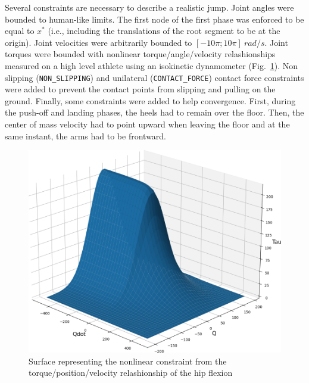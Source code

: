 Several constraints are necessary to describe a realistic jump.
Joint angles were bounded to human-like limits.
The first node of the first phase was enforced to be equal to $x^*$ (i.e., including the translations of the root segment to be at the origin). 
Joint velocities were arbitrarily bounded to $[-10 \pi; 10 \pi]~rad/s$.
Joint torques were bounded with nonlinear torque/angle/velocity relashionships measured on a high level athlete using an isokinetic dynamometer (Fig.~\ref{fig:graph_force_vitesse_longueur}). 
Non slipping (\texttt{NON\_SLIPPING}) and unilateral (\texttt{CONTACT\_FORCE}) contact force constraints were added to prevent the contact points from slipping and pulling on the ground.
Finally, some constraints were added to help convergence.
First, during the push-off and landing phases, the heels had to remain over the floor.
Then, the center of mass velocity had to point upward when leaving the floor and at the same instant, the arms had to be frontward. 

\begin{figure}[h!]
\includegraphics[width=\columnwidth]{figures/torque_angle_velocity_hip_flexion}
\caption{Surface representing the nonlinear constraint from the torque/position/velocity relashionship of the hip flexion} 
\label{fig:graph_force_vitesse_longueur}
\end{figure}

